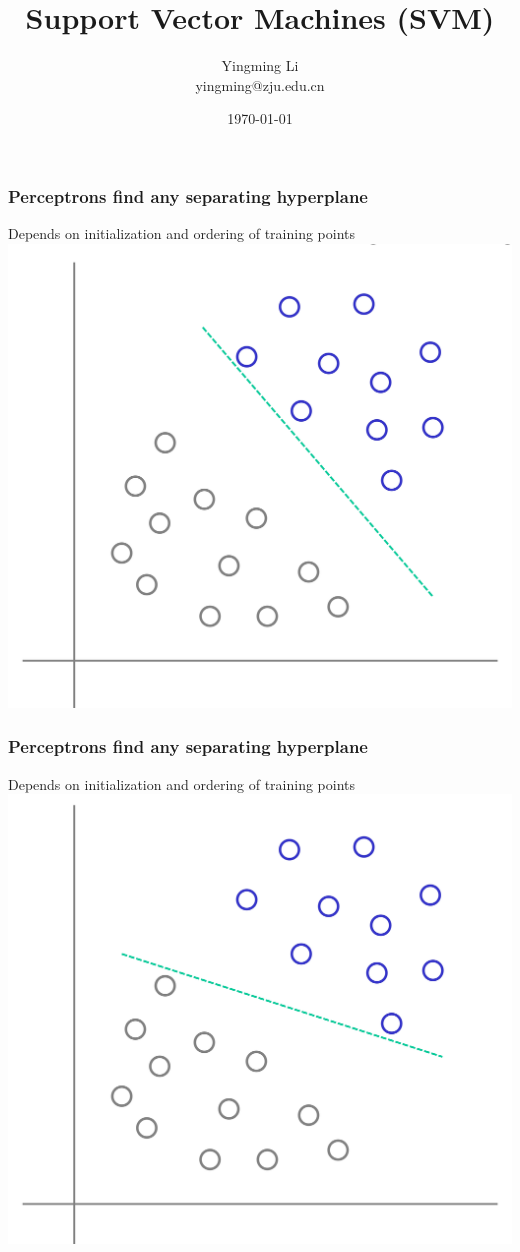 \documentclass[12pt,notes,mathserif]{beamer}
\title{Support Vector Machines (SVM)}
\author[YingmingLi]{Yingming Li \\ yingming@zju.edu.cn}
\institute[DSERC, ZJU]{Data Science \& Engineering Research Center, ZJU}
\date[\today]{\today}
\begin{document}

\begin{frame}[c]
	\titlepage
\end{frame}

\begin{frame}[c]
\frametitle{Perceptrons find any separating hyperplane}
\begin{center}
Depends on initialization and ordering of training points\\
\includegraphics[width=0.7\linewidth]{fig8/lec82.jpg}
\end{center}
\end{frame}
\begin{frame}[c]
\frametitle{Perceptrons find any separating hyperplane}
\begin{center}
Depends on initialization and ordering of training points\\
\includegraphics[width=0.7\linewidth]{fig8/lec83.jpg}
\end{center}
\end{frame}
\end{document}
